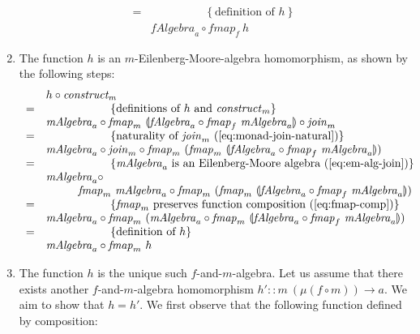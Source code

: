 \documentclass{jfp1}
\newcommand{\fold}[1]{\llparenthesis #1 \rrparenthesis}
\newcommand{\eqAnnotation}[1]{\hspace{2cm}\left\{\textrm{#1}\right\}}
\begin{document}
\begin{proof*}
\begin{enumerate}
\begin{displaymath}
\begin{array}{cl}
        =&\eqAnnotation{definition of $h$} \\
         & \mathit{fAlgebra}_a \circ \mathit{fmap}_f~h
      \end{array}
    \end{displaymath}
  \item The function $h$ is an $m$-Eilenberg-Moore-algebra
    homomorphism, as shown by the following steps:
    \begin{displaymath}
      \begin{array}{cl}
        & h \circ \mathit{construct_m} \\
        =&\eqAnnotation{definitions of $h$ and $\mathit{construct}_m$} \\
         &\mathit{mAlgebra}_a \circ \mathit{fmap}_m~\fold{\mathit{fAlgebra}_a \circ \mathit{fmap}_f~\mathit{mAlgebra}_a} \circ \mathit{join}_m \\
        =&\eqAnnotation{naturality of $\mathit{join}_m$ (\autoref{eq:monad-join-natural})} \\
         &\mathit{mAlgebra}_a \circ \mathit{join}_m \circ \mathit{fmap}_m~(\mathit{fmap}_m~\fold{\mathit{fAlgebra}_a \circ \mathit{fmap}_f~\mathit{mAlgebra}_a}) \\
        =&\eqAnnotation{$\mathit{mAlgebra}_a$ is an Eilenberg-Moore algebra (\autoref{eq:em-alg-join})} \\
         &\mathit{mAlgebra}_a \circ \\
         &\hspace{1cm}\mathit{fmap}_m~\mathit{mAlgebra}_a \circ \mathit{fmap}_m~(\mathit{fmap}_m~\fold{\mathit{fAlgebra}_a \circ \mathit{fmap}_f~\mathit{mAlgebra}_a}) \\
        =&\eqAnnotation{$\mathit{fmap}_m$ preserves function composition (\autoref{eq:fmap-comp})} \\
         &\mathit{mAlgebra}_a \circ \mathit{fmap}_m~(\mathit{mAlgebra}_a \circ \mathit{fmap}_m~\fold{\mathit{fAlgebra}_a \circ \mathit{fmap}_f~\mathit{mAlgebra}_a}) \\
        =&\eqAnnotation{definition of $h$} \\
         &\mathit{mAlgebra}_a \circ \mathit{fmap}_m~h
      \end{array}
    \end{displaymath}
  \item The function $h$ is the unique such $f$-and-$m$-algebra. Let
    us assume that there exists another $f$-and-$m$-algebra
    homomorphism $h' :: m~(\mu(f \circ m)) \to a$. We aim to show that
    $h = h'$. We first observe that the following function defined by composition:

\end{enumerate}
\end{proof*}
\end{document}
